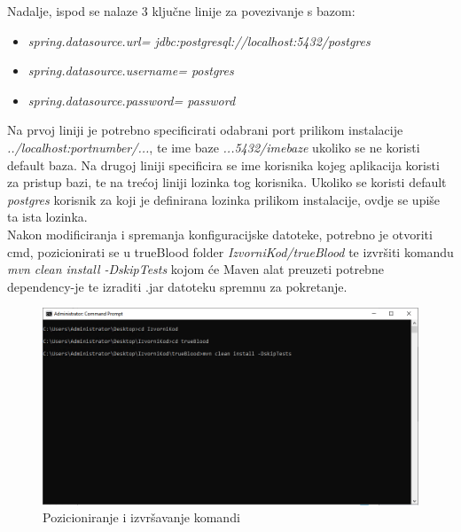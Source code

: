 			Nadalje, ispod se nalaze 3 ključne linije za povezivanje s bazom:
			\begin{itemize}
				\item{\textit{spring.datasource.url= jdbc:postgresql://localhost:5432/postgres}}
				\item{\textit{spring.datasource.username= postgres}}
				\item{\textit{spring.datasource.password= password}}
			\end{itemize}			
			
			Na prvoj liniji je potrebno specificirati odabrani port prilikom instalacije 
			\textit{../localhost:portnumber/...}, te ime baze \textit{...5432/imebaze} ukoliko se ne koristi default baza.
			Na drugoj liniji specificira se ime korisnika kojeg aplikacija koristi za pristup bazi, te na trećoj liniji lozinka tog korisnika. Ukoliko se koristi default \textit{postgres} korisnik za koji je definirana lozinka prilikom instalacije, ovdje se upiše ta ista lozinka.\\
			
			Nakon modificiranja i spremanja konfiguracijske datoteke, potrebno je otvoriti cmd, pozicionirati se u trueBlood folder \textit{IzvorniKod/trueBlood} te izvršiti komandu \textit{mvn clean install -DskipTests} kojom će Maven alat preuzeti potrebne dependency-je te izraditi .jar datoteku spremnu za pokretanje.
			\eject
			
			\begin{figure}[H]
			\centering
			\includegraphics[width=\textwidth]{slike/CmdCommands}
			\caption{Pozicioniranje i izvršavanje komandi}
			\label{fig:CmdCommands}
			\end{figure}
				
